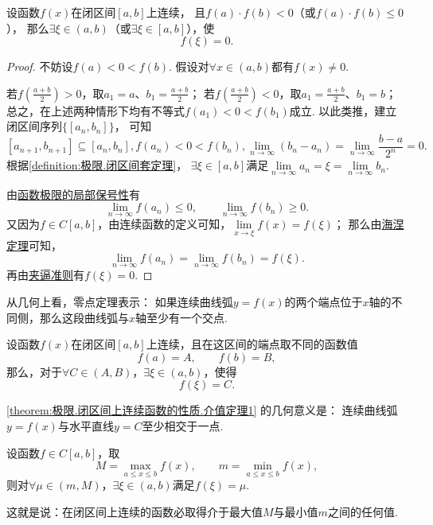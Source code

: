 \begin{theorem}[零点定理]\label{theorem:极限.闭区间上连续函数的性质.零点定理}
设函数\(f(x)\)在闭区间\([a,b]\)上连续，
且\(f(a) \cdot f(b)<0\)（或\(f(a) \cdot f(b) \leq 0\)），
那么\(\exists\xi\in(a,b)\)（或\(\exists\xi\in[a,b]\)），使\[
f(\xi) = 0.
\]
\begin{proof}
不妨设\(f(a) < 0 < f(b)\).
假设对\(\forall x\in(a,b)\)都有\(f(x) \neq 0\).

若\(f\left(\frac{a+b}{2}\right)>0\)，取\(a_1=a\)、\(b_1=\frac{a+b}{2}\)；
若\(f\left(\frac{a+b}{2}\right)<0\)，取\(a_1=\frac{a+b}{2}\)、\(b_1=b\)；
总之，在上述两种情形下均有不等式\(f(a_1) < 0 < f(b_1)\)成立.
以此类推，建立闭区间序列\(\{[a_n,b_n]\}\)，
可知\[
[a_{n+1},b_{n+1}] \subseteq [a_n,b_n],
f(a_n) < 0 < f(b_n),
\lim\limits_{n\to\infty} (b_n - a_n)
= \lim\limits_{n\to\infty} \frac{b-a}{2^n}
= 0.
\]
根据\cref{definition:极限.闭区间套定理}，
\(\exists\xi\in[a,b]\)满足\(\lim\limits_{n\to\infty} a_n
= \xi
= \lim\limits_{n\to\infty} b_n\).

由\hyperref[theorem:极限.函数极限的局部保号性3]{函数极限的局部保号性}有\[
\lim\limits_{n\to\infty} f(a_n) \leq 0,
\qquad
\lim\limits_{n\to\infty} f(b_n) \geq 0.
\]
又因为\(f \in C[a,b]\)，由连续函数的定义可知，\(\lim\limits_{x\to\xi} f(x) = f(\xi)\)；
那么由\hyperref[theorem:极限.海涅定理]{海涅定理}可知，\[
\lim\limits_{n\to\infty} f(a_n)
= \lim\limits_{n\to\infty} f(b_n)
= f(\xi).
\]再由\hyperref[theorem:极限.夹逼准则]{夹逼准则}有\(f(\xi)=0\).
\end{proof}
\end{theorem}
从几何上看，零点定理表示：
如果连续曲线弧\(y = f(x)\)的两个端点位于\(x\)轴的不同侧，那么这段曲线弧与\(x\)轴至少有一个交点.

\begin{theorem}[介值定理]\label{theorem:极限.闭区间上连续函数的性质.介值定理1}
设函数\(f(x)\)在闭区间\([a,b]\)上连续，且在这区间的端点取不同的函数值\[
f(a) = A, \qquad
f(b) = B,
\]那么，对于\(\forall C \in (A,B)\)，\(\exists \xi \in (a,b)\)，使得\[
f(\xi) = C.
\]
\end{theorem}
\cref{theorem:极限.闭区间上连续函数的性质.介值定理1} 的几何意义是：
连续曲线弧\(y=f(x)\)与水平直线\(y=C\)至少相交于一点.

\begin{corollary}\label{theorem:极限.闭区间上连续函数的性质.介值定理2}
设函数\(f \in C[a,b]\)，取\[
M=\max_{a \leq x \leq b} f(x), \qquad
m=\min_{a \leq x \leq b} f(x),
\]则对\(\forall\mu\in(m,M)\)，\(\exists\xi\in(a,b)\)满足\(f(\xi)=\mu\).
\end{corollary}
这就是说：在闭区间上连续的函数必取得介于最大值\(M\)与最小值\(m\)之间的任何值.

